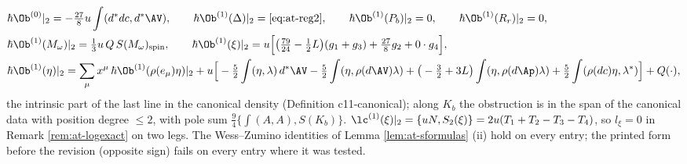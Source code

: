 \begin{proposition}
\label{prop:at-c-ob1}
\[
\begin{aligned}
&\hbar\Ob^{(0)}|_2=-\tfrac{27}8u\int(d^*dc,d^*\AV),\qquad \hbar\Ob^{(1)}(\Delta)|_2=\eqref{eq:at-reg2},\qquad \hbar\Ob^{(1)}(P_b)|_2=0,\qquad \hbar\Ob^{(1)}(R_r)|_2=0,\\
&\hbar\Ob^{(1)}(M_\omega)|_2=\tfrac13u\,Q\,S(M_\omega)_{\rm spin},\qquad \hbar\Ob^{(1)}(\xi)|_2=u\Big[\big(\tfrac{79}{24}-\tfrac12L\big)(g_1+g_3)+\tfrac{27}8g_2+0\cdot g_4\Big],\\
&\hbar\Ob^{(1)}(\eta)|_2=\sum_\mu x^\mu\,\hbar\Ob^{(1)}(\rho(e_\mu)\eta)|_2+u\Big[-\tfrac52\int(\eta,\lambda)\,d^*\AV-\tfrac52\int(\eta,\rho(d\AV)\lambda)+\big(-\tfrac32+3L\big)\int(\eta,\rho(d\Ap)\lambda)+\tfrac52\int(\rho(dc)\eta,\lambda^*)\Big]+Q(\cdot),
\end{aligned}
\]
the intrinsic part of the last line in the canonical density (Definition c11-canonical); along $K_b$ the obstruction is in the span of the canonical data with position degree $\le2$, with pole sum $\tfrac94\{\int(A,A),S(K_b)\}$. $\lc^{(1)}(\xi)|_2=\{uN,S_2(\xi)\}=2u(T_1+T_2-T_3-T_4)$, so $l_\xi=0$ in Remark \ref{rem:at-logexact} on two legs. The Wess--Zumino identities of Lemma \ref{lem:at-sformulas} (ii) hold on every entry; the printed form before the revision (opposite sign) fails on every entry where it was tested.
\end{proposition}

